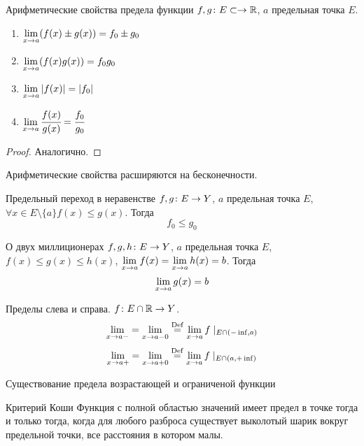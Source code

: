 \begin{theorem}{Арифметические свойства предела функции}
$f, g\colon E \subset \rightarrow \mathbb{R}$, $a$ предельная точка $E$.
\begin{enumerate}
\item $\lim\limits_{x\rightarrow a} (f(x) \pm g(x)) = f_0 \pm g_0$
\item $\lim\limits_{x\rightarrow a} (f(x) g(x)) = f_0 g_0$
\item $\lim\limits_{x\rightarrow a} \left|f(x)\right| = \left|f_0\right|$
\item $\lim\limits_{x\rightarrow a} \cfrac{f(x)}{g(x)}=\cfrac{f_0}{g_0}$
\end{enumerate}
\end{theorem}
\begin{proof}
Аналогично.
\end{proof}

\begin{Rem}
Арифметические свойства расширяются на бесконечности.
\end{Rem}

\begin{theorem}{Предельный переход в неравенстве}
$f, g\colon E \rightarrow Y$, $a$ предельная точка $E$, $\forall x \in E\setminus \{a\} f(x) \leqslant g(x)$. Тогда 
$$f_0 \leqslant g_0$$
\end{theorem}

\begin{theorem}{О двух миллиционерах}
$f, g, h\colon E \rightarrow Y$, $a$ предельная точка $E$, $f(x) \leqslant g(x) \leqslant h(x)$, $\lim\limits_{x\rightarrow a} f(x) = \lim\limits_{x\rightarrow a} h(x) = b$. Тогда
$$\lim_{x\rightarrow a} g(x) = b$$
\end{theorem}

\begin{Def}
Пределы слева и справа. $f\colon E \cap \mathbb{R} \rightarrow Y$.
$$\lim\limits_{x\rightarrow a-} = \lim\limits_{x\rightarrow a-0} \stackrel{\mathrm{Def}}{=} \lim\limits_{x\rightarrow a} f\mid_{E\cap(-\inf,a)}$$
$$\lim\limits_{x\rightarrow a+} = \lim\limits_{x\rightarrow a+0} \stackrel{\mathrm{Def}}{=} \lim\limits_{x\rightarrow a} f\mid_{E\cap(a,+\inf)}$$
\end{Def}

\begin{theorem}{Существование предела возрастающей и ограниченой функции}

\end{theorem}

\begin{theorem}{Критерий Коши}
Функция с полной областью значений имеет предел в точке тогда и только тогда, когда для любого разброса существует выколотый шарик вокруг предельной точки, все расстояния в котором малы.
\end{theorem}
